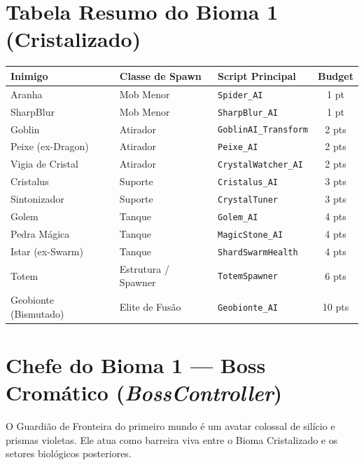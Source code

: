 \documentclass[a4paper,12pt]{report}
\begin{document}
\section{Tabela Resumo do Bioma 1 (Cristalizado)}
\begin{center}
\begin{tabular}{|l|l|l|c|}
    \hline
    \textbf{Inimigo} & \textbf{Classe de Spawn} & \textbf{Script Principal} & \textbf{Budget} \\
    \hline
    Aranha               & Mob Menor           & \texttt{Spider\_AI}           & 1 pt \\
    SharpBlur            & Mob Menor           & \texttt{SharpBlur\_AI}        & 1 pt \\
    Goblin               & Atirador            & \texttt{GoblinAI\_Transform}  & 2 pts \\
    Peixe (ex-Dragon)    & Atirador            & \texttt{Peixe\_AI}            & 2 pts \\
    Vigia de Cristal     & Atirador            & \texttt{CrystalWatcher\_AI}   & 2 pts \\
    Cristalus            & Suporte             & \texttt{Cristalus\_AI}        & 3 pts \\
    Sintonizador         & Suporte             & \texttt{CrystalTuner}         & 3 pts \\
    Golem                & Tanque              & \texttt{Golem\_AI}            & 4 pts \\
    Pedra Mágica         & Tanque              & \texttt{MagicStone\_AI}       & 4 pts \\
    Istar (ex-Swarm)     & Tanque              & \texttt{ShardSwarmHealth}     & 4 pts \\
    Totem                & Estrutura / Spawner & \texttt{TotemSpawner}         & 6 pts \\
    Geobionte (Bismutado)& Elite de Fusão      & \texttt{Geobionte\_AI}        & 10 pts \\
    \hline
\end{tabular}
\end{center}

\section{Chefe do Bioma 1 --- Boss Cromático (\textit{BossController})}
O Guardião de Fronteira do primeiro mundo é um avatar colossal de silício e prismas violetas. Ele atua como barreira viva entre o Bioma Cristalizado e os setores biológicos posteriores.
\end{document}
